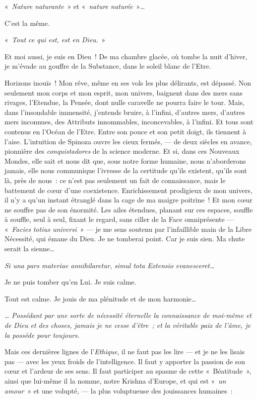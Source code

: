 «~\emph{Nature naturante}~» et «~\emph{nature naturée}~»\ldots{}

C'est la même.

«~\emph{Tout ce qui est, est en Dieu}.~»

Et moi aussi, je suis en Dieu~! De ma chambre glacée, où tombe la nuit
d'hiver, je m'évade au gouffre de la Substance, dans le soleil blanc de
l'Etre.

Horizons inouïs~! Mon rêve, même en ses vols les plus délirants, est
dépassé. Non seulement mon corps et mon esprit, mon univers, baignent
dans des mers sans rivages, l'Etendue, la Pensée, dont nulle caravelle
ne pourra faire le tour. Mais, dans l'insondable immensité, j'entends
bruire, à l'infini, d'autres mers, d'autres mers inconnues, des
Attributs innommables, inconcevables, à l'infini. Et tous sont contenus
en l'Océan de l'Etre. Entre son pouce et son petit doigt, ils tiennent à
l'aise. L'intuition de Spinoza ouvre les cieux fermés, --- de deux
siècles en avance, pionnière des \emph{conquistadores} de la science
moderne. Et si, dans ces Nouveaux Mondes, elle sait et nous dit que,
sous notre forme humaine, nous n'aborderons jamais, elle nous communique
l'ivresse de la certitude qu'ils existent, qu'ils sont là, près de
nous~: ce n'est pas seulement un fait de connaissance, mais le battement
de c\oe ur d'une coexistence. Enrichissement prodigieux de mon univers, il
n'y a qu'un instant étranglé dans la cage de ma maigre poitrine~! Et mon
c\oe ur ne souffre pas de son énormité. Les ailes étendues, planant sur
ces espaces, souffle à souffle, seul à seul, fixant le regard, sans
ciller de la Face omniprésente --- «~\emph{Facies totius
universi}~» --- je me sens soutenu par
l'infaillible main de la Libre Nécessité, qui émane du Dieu. Je ne
tomberai point. Car je suis sien. Ma chute serait la sienne\ldots{}

\emph{Si una pars materiae annihilaretur, simul tota Extensio
evanesceret\ldots{}}

Je ne puis tomber qu'en Lui. Je suis calme.

\pagebreak

Tout est calme. Je jouis de ma plénitude et de mon harmonie\ldots{}

\emph{\ldots{} Possédant par une sorte de nécessité éternelle la connaissance
de moi-même et de Dieu et des choses, jamais je ne cesse d'être~; et la
véritable paix de l'âme, je la possède pour toujours.}

Mais ces dernières lignes de l'\emph{Ethique}, il ne faut pas les lire
--- et je ne les lisais pas --- avec les yeux froids de l'intelligence. Il
faut y apporter la passion de son c\oe ur et l'ardeur de ses sens. Il faut
participer au spasme de cette «~Béatitude~», ainsi que lui-même il la
nomme, notre Krishna d'Europe, et qui est «~\emph{un amour}~» et une volupté, --- la plus voluptueuse
des jouissances humaines~:

